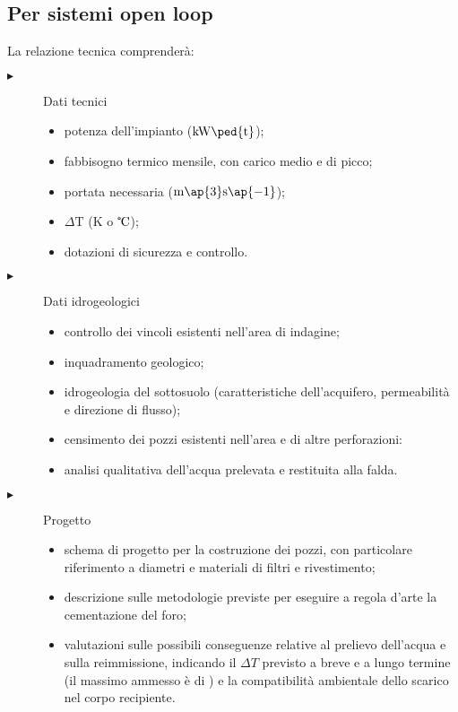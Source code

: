 \subsection{Per sistemi open loop}
La relazione tecnica comprenderà:
\begin{description}
\item[$\blacktriangleright$] Dati tecnici
\begin{itemize}
\item potenza dell'impianto ($\mathrm{kW\ped{t}}$);
\item fabbisogno termico mensile, con carico medio e di picco;
\item portata necessaria ($\mathrm{m\ap{3}s\ap{-1}}$);
\item $\Delta \mathrm{T}$ (K o $\celsius$);
\item dotazioni di sicurezza e controllo.
\end{itemize}
\item[$\blacktriangleright$] Dati idrogeologici
\begin{itemize}
\item controllo dei vincoli esistenti nell'area di indagine;
\item inquadramento geologico;
\item idrogeologia del sottosuolo (caratteristiche dell'acquifero, permeabilità e direzione di flusso);
\item censimento dei pozzi esistenti nell'area e di altre perforazioni:
\item analisi qualitativa dell'acqua prelevata e restituita alla falda.
\end{itemize}
\item[$\blacktriangleright$] Progetto
\begin{itemize}
\item schema di progetto per la costruzione dei pozzi, con particolare riferimento a diametri e materiali di filtri e rivestimento;
\item descrizione sulle metodologie previste per eseguire a regola d'arte la cementazione del foro;
\item valutazioni sulle possibili conseguenze relative al prelievo dell'acqua e sulla reimmissione, indicando il $\Delta T$ previsto a breve e a lungo termine (il massimo ammesso è di ) e la compatibilità ambientale dello scarico nel corpo recipiente.
\end{itemize}
\end{description}

\newpage

